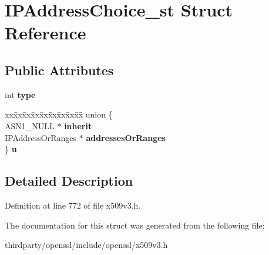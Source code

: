 \hypertarget{struct_i_p_address_choice__st}{}\section{I\+P\+Address\+Choice\+\_\+st Struct Reference}
\label{struct_i_p_address_choice__st}
\subsection*{Public Attributes}
\begin{DoxyCompactItemize}
\item 
\mbox{\label{struct_i_p_address_choice__st_a7682bd3a3f986e97124f6f3443a094a1}} 
int {\bfseries type}
\item 
\mbox{\label{struct_i_p_address_choice__st_a422e8f8b5e01af7868d630ad11341a16}} 
\begin{tabbing}
xx\=xx\=xx\=xx\=xx\=xx\=xx\=xx\=xx\=\kill
union \{\\
\>ASN1\_NULL $\ast$ {\bfseries inherit}\\
\>IPAddressOrRanges $\ast$ {\bfseries addressesOrRanges}\\
\} {\bfseries u}\\

\end{tabbing}\end{DoxyCompactItemize}


\subsection{Detailed Description}


Definition at line 772 of file x509v3.\+h.



The documentation for this struct was generated from the following file\+:\begin{DoxyCompactItemize}
\item 
thirdparty/openssl/include/openssl/x509v3.\+h\end{DoxyCompactItemize}
